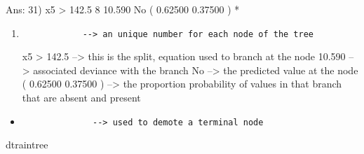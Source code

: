 \documentclass[
]{article}
\newenvironment{Shaded}{\begin{snugshade}}{\end{snugshade}}
\newcommand{\NormalTok}[1]{#1}
\begin{document}
Ans: 31) x5 \textgreater{} 142.5 8 10.590 No ( 0.62500 0.37500 ) *

\begin{enumerate}
\def\labelenumi{\arabic{enumi})}
\setcounter{enumi}{30}
\item
\begin{verbatim}
            --> an unique number for each node of the tree
\end{verbatim}

  x5 \textgreater{} 142.5 --\textgreater{} this is the split, equation
  used to branch at the node 10.590 --\textgreater{} associated deviance
  with the branch No --\textgreater{} the predicted value at the node (
  0.62500 0.37500 ) --\textgreater{} the proportion probability of
  values in that branch that are absent and present
\end{enumerate}

\begin{itemize}
\item
\begin{verbatim}
              --> used to demote a terminal node
\end{verbatim}
\end{itemize}

\begin{Shaded}
\begin{Highlighting}[]
\NormalTok{dtraintree}
\end{Highlighting}
\end{Shaded}
\end{document}
